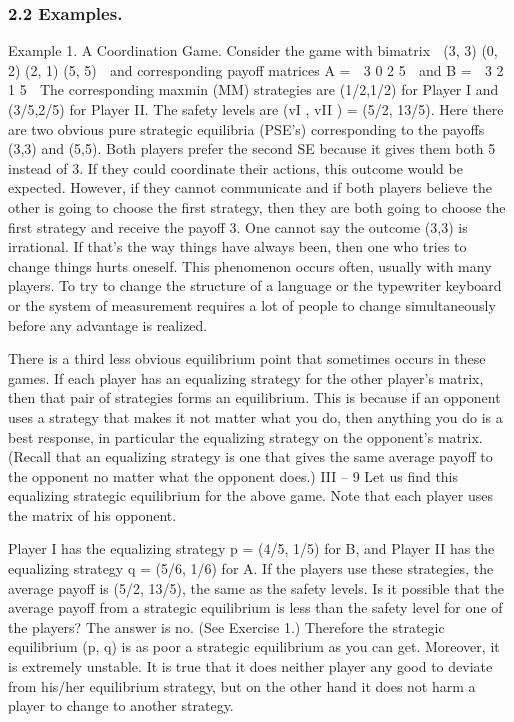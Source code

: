 \documentclass{article}
\begin{document}
\subsubsection{2.2 Examples.} Example 1. A Coordination Game. Consider the game with
bimatrix
 (3, 3) (0, 2)
(2, 1) (5, 5) 
and corresponding payoff matrices
A =
 3 0
2 5 
and B =
 3 2
1 5 
The corresponding maxmin (MM) strategies are (1/2,1/2) for Player I and (3/5,2/5) for
Player II. The safety levels are (vI , vII ) = (5/2, 13/5).
Here there are two obvious pure strategic equilibria (PSE’s) corresponding to the
payoffs (3,3) and (5,5). Both players prefer the second SE because it gives them both
5 instead of 3. If they could coordinate their actions, this outcome would be expected.
However, if they cannot communicate and if both players believe the other is going to
choose the first strategy, then they are both going to choose the first strategy and receive
the payoff 3. One cannot say the outcome (3,3) is irrational. If that’s the way things
have always been, then one who tries to change things hurts oneself. This phenomenon
occurs often, usually with many players. To try to change the structure of a language or
the typewriter keyboard or the system of measurement requires a lot of people to change
simultaneously before any advantage is realized.

There is a third less obvious equilibrium point that sometimes occurs in these games.
If each player has an equalizing strategy for the other player’s matrix, then that pair of
strategies forms an equilibrium. This is because if an opponent uses a strategy that makes
it not matter what you do, then anything you do is a best response, in particular the
equalizing strategy on the opponent’s matrix. (Recall that an equalizing strategy is one
that gives the same average payoff to the opponent no matter what the opponent does.)
III – 9
Let us find this equalizing strategic equilibrium for the above game. Note that
each player uses the matrix of his opponent. 

Player I has the equalizing strategy p =
(4/5, 1/5) for B, and Player II has the equalizing strategy q = (5/6, 1/6) for A. If the
players use these strategies, the average payoff is (5/2, 13/5), the same as the safety levels.
Is it possible that the average payoff from a strategic equilibrium is less than the
safety level for one of the players? The answer is no. (See Exercise 1.) Therefore the
strategic equilibrium (p, q) is as poor a strategic equilibrium as you can get. Moreover,
it is extremely unstable. It is true that it does neither player any good to deviate from
his/her equilibrium strategy, but on the other hand it does not harm a player to change
to another strategy.
\end{document}
